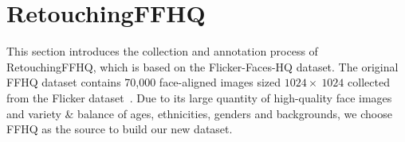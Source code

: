 \documentclass[sigconf]{acmart}
\begin{document}


\section{RetouchingFFHQ}
This section introduces the collection and annotation process of RetouchingFFHQ, which is based on the Flicker-Faces-HQ dataset. 
The original FFHQ dataset contains 70,000 face-aligned images sized $1024\times~1024$ collected from the Flicker dataset~\cite{FFHQ}.
Due to its large quantity of high-quality face images and variety \& balance of ages, ethnicities, genders and backgrounds, we choose FFHQ as the source to build our new dataset.
\end{document}
